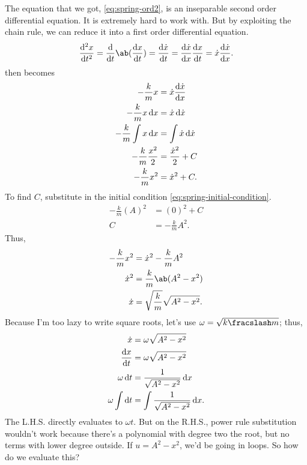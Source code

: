 The equation that we got, \cref{eq:spring-ord2}, is an inseparable second order differential equation. It is extremely hard to work with. But by exploiting the chain rule, we can reduce it into a first order differential equation.
\begin{equation}
  \odv[ord = 2]{x}{t} = \odv*{\ab(\odv{x}{t})}{t} = \odv{\dot{x}}{t} = \odv{\dot{x}}{x}\odv{x}{t} = \dot{x}\odv{\dot{x}}{x}.
\end{equation}
 then becomes
\begin{align}
  -\frac{k}{m}x              & = \dot{x}\odv{\dot{x}}{x}   \\
  -\frac{k}{m}x\odif{x}      & = \dot{x}\odif{\dot{x}}     \\
  -\frac{k}{m}\int x\odif{x} & = \int\dot{x}\odif{\dot{x}} \\
  -\frac{k}{m}\frac{x^2}{2}  & = \frac{\dot{x}^2}{2} + C   \\
  -\frac{k}{m}x^2            & = \dot{x}^2 + C.
\end{align}
To find \(C\), substitute in the initial condition \cref{eq:spring-initial-condition}.
\begin{align}
  -\frac{k}{m}(A)^2 & = (0)^2 + C        \\
  C                 & = -\frac{k}{m}A^2.
\end{align}
Thus,
\begin{align}
  -\frac{k}{m}x^2 & = \dot{x}^2 - \frac{k}{m}A^2          \\
  \dot{x}^2       & = \frac{k}{m}\ab(A^2 - x^2)           \\
  \dot{x}         & = \sqrt{\frac{k}{m}}\sqrt{A^2 - x^2}.
\end{align}
Because I'm too lazy to write square roots, let's use \(\omega = \sqrt{\flatfrac{k}{m}}\); thus,
\begin{align}
  \dot{x}            & = \omega\sqrt{A^2 - x^2}                                           \\
  \odv{x}{t}         & = \omega\sqrt{A^2 - x^2}                                           \\
  \omega\odif{t}     & = \frac{1}{\sqrt{A^2 - x^2}}\odif{x}                               \\
  \omega\int\odif{t} & = \int\frac{1}{\sqrt{A^2 - x^2}}\odif{x}. \label{eq:spring-ord1-d}
\end{align}
The L.H.S. directly evaluates to \(\omega t\). But on the R.H.S., power rule substitution wouldn't work because there's a polynomial with degree two the root, but no terms with lower degree outside. If \(u = A^2 - x^2\), we'd be going in loops. So how do we evaluate this?

